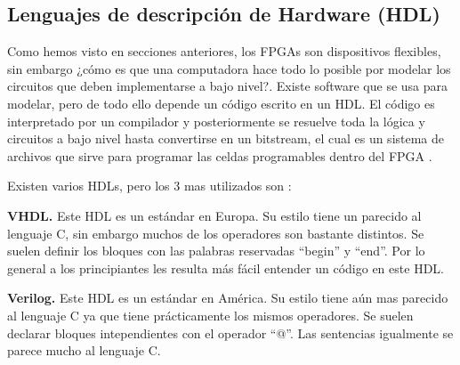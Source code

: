 \documentclass[twoside,spanish,ESP,MSc]{plantillaLabUPV}
\theoremstyle{definition}
\newcommand{\f}{FPGA }
\newcommand{\fs}{FPGAs }
\begin{document}



\subsection{Lenguajes de descripción de Hardware (HDL)}

Como hemos visto en secciones anteriores, los \fs son dispositivos flexibles, sin embargo ¿cómo es que una computadora hace todo lo posible por modelar los circuitos que deben implementarse a bajo nivel?. Existe software que se usa para modelar, pero de todo ello depende un código escrito en un HDL. El código es interpretado por un compilador y posteriormente se resuelve toda la lógica y circuitos a bajo nivel hasta convertirse en un bitstream, el cual es un sistema de archivos que sirve para programar las celdas programables dentro del \f \cite{verhdl}.

Existen varios HDLs, pero los 3 mas utilizados son \cite{hdls}:


\checkmark\textbf{VHDL.} Este HDL es un estándar en Europa. Su estilo tiene un parecido al lenguaje C, sin embargo muchos de los operadores son bastante distintos. Se suelen definir los bloques con las palabras reservadas ``begin'' y ``end''. Por lo general a los principiantes les resulta más fácil entender un código en este HDL.


\checkmark\textbf{Verilog.} Este HDL es un estándar en América. Su estilo tiene aún mas parecido al lenguaje C ya que tiene prácticamente los mismos operadores. Se suelen declarar bloques intependientes con el operador ``@''. Las sentencias igualmente se parece mucho al lenguaje C.
\end{document}
